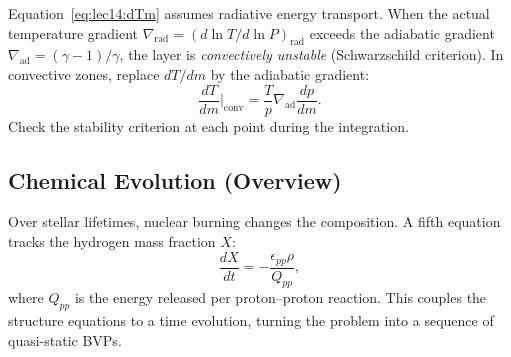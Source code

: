 Equation~\eqref{eq:lec14:dTm} assumes radiative energy transport.
When the actual temperature gradient
$\nabla_\text{rad} = (d\ln T/d\ln P)_\text{rad}$ exceeds the
adiabatic gradient $\nabla_\text{ad} = (\gamma-1)/\gamma$,
the layer is \emph{convectively unstable} (Schwarzschild criterion).
In convective zones, replace $dT/dm$ by the adiabatic gradient:
\begin{equation}
  \frac{dT}{dm}\bigg|_\text{conv}
  = \frac{T}{p}\nabla_\text{ad}\frac{dp}{dm}.
  \label{eq:lec14:conv}
\end{equation}
Check the stability criterion at each point during the integration.

\subsection{Chemical Evolution (Overview)}\label{subsec:lec14:chem}

Over stellar lifetimes, nuclear burning changes the composition.
A fifth equation tracks the hydrogen mass fraction $X$:
\begin{equation}
  \frac{dX}{dt} = -\frac{\epsilon_{pp}\rho}{Q_{pp}},
  \label{eq:lec14:chem}
\end{equation}
where $Q_{pp}$ is the energy released per proton–proton reaction.
This couples the structure equations to a time evolution,
turning the problem into a sequence of quasi-static BVPs.
